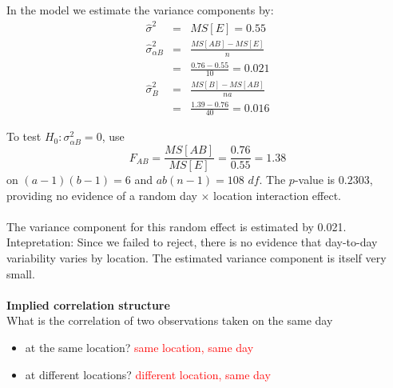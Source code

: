 In the model we estimate the variance components by:
\begin{eqnarray*}
\hat\sigma^2 & = & MS[E]  =  0.55 \\
\hat\sigma_{\alpha B}^2 & = & \frac{MS[AB]-MS[E]}{n} \\
& = & \frac{0.76-0.55}{10}  =  0.021  \\
\hat\sigma_{B}^2 & = & \frac{MS[B]-MS[AB]}{na} \\
& = & \frac{1.39-0.76}{40}  =  0.016
\end{eqnarray*}

To test $H_0: \sigma_{\alpha B}^2=0$, use 
$$F_{AB}=\frac{MS[AB]}{MS[E]}=\frac{0.76}{0.55}=1.38$$
on $(a-1)(b-1)=6$ and $ab(n-1)=108$ $df$.  The $p$-value is $0.2303$, providing no evidence of a random day $\times$ location interaction effect. \\~\\
The variance component for this random effect is estimated by 0.021.  Intepretation: Since we failed to reject, there is no evidence that day-to-day variability varies by location.  The estimated variance component is itself very small.\\~\\

\textbf{Implied correlation structure}\\
What is the correlation of two observations taken on the same day 
\begin{itemize}
\item at the same location? \textcolor{red}{same location, same day}
\item at different locations? \textcolor{red}{different location, same day}
\end{itemize}

